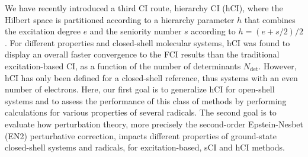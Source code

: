 \documentclass[aip,jcp,reprint,noshowkeys,superscriptaddress]{revtex4-1}
\newcommand{\Ndet}{N_\text{det}}
\begin{document}
We have recently introduced a third CI route, hierarchy CI (hCI), \cite{Kossoski_2022}
where the Hilbert space is partitioned according to a hierarchy parameter $h$ that combines the excitation degree $e$ and the seniority number $s$ according to $h = (e+s/2)/2$.
For different properties and closed-shell molecular systems, 
hCI was found to display an overall faster convergence to the FCI results than the traditional excitation-based CI, as a function of the number of determinants $\Ndet$. \cite{Kossoski_2022}
However, hCI has only been defined for a closed-shell reference, thus systems with an even number of electrons.
Here, our first goal is to generalize hCI for open-shell systems and to assess the performance of this class of methods by performing calculations for various properties of several radicals.
The second goal is to evaluate how perturbation theory, more precisely the second-order Epstein-Nesbet (EN2) perturbative correction, \cite{Garniron_2019}
impacts different properties of ground-state closed-shell systems and radicals, for excitation-based, sCI and hCI methods.
\end{document}
